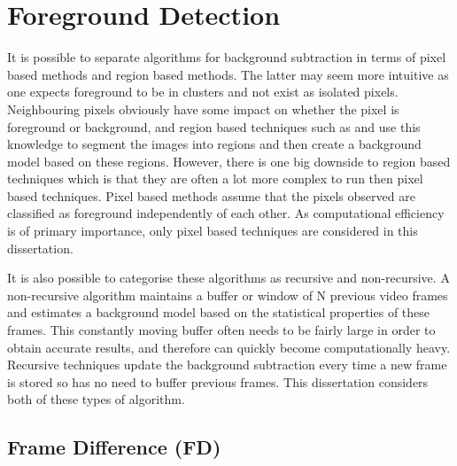 \section{ Foreground Detection}
\label{sec:techn-backgr-subtr}
It is possible to separate algorithms for background subtraction in terms of pixel based methods and region based methods. The latter may seem more intuitive as one expects foreground to be in clusters and not exist as isolated pixels. Neighbouring pixels obviously have some impact on whether the pixel is foreground or background, and region based techniques such as  \cite{elgammal2000non} and \cite{toyama1999wallflower} use this knowledge to segment the images into regions and then create a background model based on these regions. However, there is one big downside to region based techniques which is that they are often a lot more complex to run then pixel based techniques. Pixel based methods assume that the pixels observed are classified as foreground independently of each other. As computational efficiency is of primary importance, only pixel based techniques are considered in this dissertation. 

It is also possible to categorise these algorithms as recursive and non-recursive. A non-recursive algorithm maintains a buffer or window of N previous video frames and estimates a background model based on the statistical properties of these frames. This constantly moving buffer often needs to be fairly large in order to obtain accurate results, and therefore can quickly become computationally heavy. Recursive techniques update the background subtraction every time a new frame is stored so has no need to buffer previous frames. This dissertation considers both of these types of algorithm.

\subsection{Frame Difference (FD)}
\label{sec:frame-difference}

